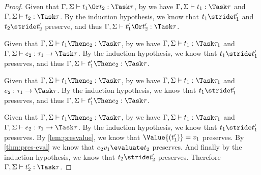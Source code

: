 \begin{proof}
  {Given that $\Gamma,\Sigma\infers t_1\Or t_2:\Task\tau$, by  we have $\Gamma,\Sigma\infers t_1:\Task\tau$ and $\Gamma,\Sigma\infers t_2:\Task\tau$.
  By the induction hypothesis, we know that $t_1\stride t_1'$ and $t_2\stride t_2'$ preserve, and thus $\Gamma,\Sigma\infers t_1'\Or t_2':\Task\tau$.}

  {Given that $\Gamma,\Sigma\infers t_1\Then e_2:\Task\tau$, by  we have $\Gamma,\Sigma\infers t_1:\Task\tau_1$ and $\Gamma,\Sigma\infers e_2:\tau_1\to\Task\tau$.
  By the induction hypothesis, we know that $t_1\stride t_1'$ preserves, and thus $\Gamma,\Sigma\infers t_1'\Then e_2:\Task\tau$.}

  {Given that $\Gamma,\Sigma\infers t_1\Then e_2:\Task\tau$,
  by  we have $\Gamma,\Sigma\infers t_1:\Task\tau_1$ and
  $e_2:\tau_1\to\Task\tau$. By the induction
  hypothesis, we know that $t_1\stride t_1'$ preserves, and thus
  $\Gamma,\Sigma\infers t_1'\Then e_2:\Task\tau$.}

  {Given that $\Gamma,\Sigma\infers t_1\Then e_2:\Task\tau$, by  we have
  $\Gamma,\Sigma\infers t_1:\Task\tau_1$ and
  $\Gamma,\Sigma\infers e_2:\tau_1\to\Task\tau$. By the induction hypothesis, we
  know that $t_1\stride t_1'$ preserves. By \cref{lem:presvalue}, we know
  that $\Value{(t_1')}=v_1$ preserves. By \cref{thm:pres-eval} we know
  that $e_2 v_1\evaluate t_2$ preserves. And finally by the induction hypothesis,
  we know that $t_2\stride t_2'$ preserves. Therefore
  $\Gamma,\Sigma\infers t_2':\Task\tau$.}

\end{proof}



\subsection{}

